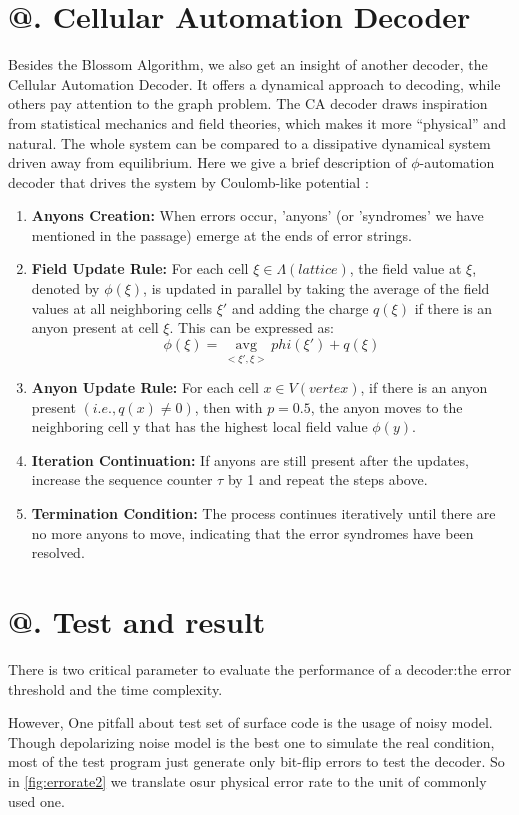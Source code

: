 \documentclass[
    a4paper, %
    10pt, %
    unnumberedsections, %
    twoside, %
]{LTJournalArticle}
\makeatletter
\newcommand{\Rmnum}[1]{\expandafter\@slowromancap\romannumeral #1@}
\makeatother
\begin{document}
\section{\Rmnum{4}. Cellular Automation Decoder}
    Besides the Blossom Algorithm, we also get an insight of another decoder, the Cellular Automation Decoder. It offers a dynamical approach to decoding, while others pay attention to the graph problem. The CA decoder draws inspiration from statistical mechanics and field theories, which makes it more “physical” and natural. The whole system can be compared to a dissipative dynamical system driven away from equilibrium. Here we give a brief description of $\phi$-automation decoder that drives the system by Coulomb-like potential \cite{11}: 
\begin{enumerate}
    \item \textbf{Anyons Creation:} When errors occur, 'anyons' (or 'syndromes' we have mentioned in the passage) emerge at the ends of error strings.
    \item \textbf{Field Update Rule:} For each cell $\xi \in \Lambda(lattice)$, the field value at $\xi$, denoted by $\phi(\xi)$, is updated in parallel by taking the average of the field values at all neighboring cells $\xi'$ and adding the charge $q(\xi)$ if there is an anyon present at cell $\xi$. This can be expressed as: $$\phi(\xi) = \mathop{avg}\limits_{<\xi',\xi>}phi(\xi')+q(\xi)$$
    \item \textbf{Anyon Update Rule:} For each cell $x \in V(vertex)$, if there is an anyon present $(i.e.,q(x)\neq 0)$, then with $p=0.5$, the anyon moves to the neighboring cell y that has the highest local field value $\phi(y)$.
    \item \textbf{Iteration Continuation:} If anyons are still present after the updates, increase the sequence counter $\tau$ by 1 and repeat the steps above.
    \item \textbf{Termination Condition:} The process continues iteratively until there are no more anyons to move, indicating that the error syndromes have been resolved.
\end{enumerate}

\section{\Rmnum{5}. Test and result}
There is two critical parameter to evaluate the performance of a decoder:the error threshold and the time complexity.

However, One pitfall about test set of surface code is the usage of noisy model.
Though depolarizing noise model is the best one to simulate the real condition, 
most of the test program just generate only bit-flip errors to test the decoder.
So in \ref{fig:errorate2} we translate osur physical error rate
to the unit of commonly used one.
\end{document}
